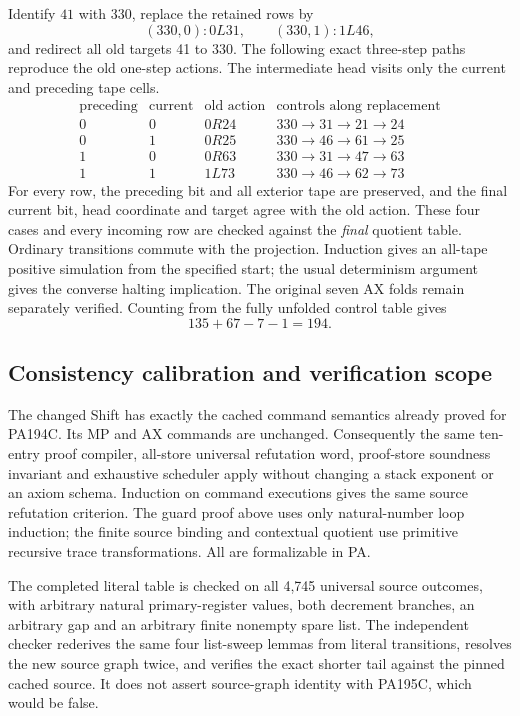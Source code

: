 Identify $41$ with $330$, replace the retained rows by
\[
                  (330,0):0L31,\qquad(330,1):1L46,
\]
and redirect all old targets 41 to 330. The following exact three-step
paths reproduce the old one-step actions. The intermediate head visits
only the current and preceding tape cells.
\[
\begin{array}{cc|c|l}
\text{preceding}&\text{current}&\text{old action}&\text{controls along replacement}\\\hline
0&0&0R24&330\to31\to21\to24\\
0&1&0R25&330\to46\to61\to25\\
1&0&0R63&330\to31\to47\to63\\
1&1&1L73&330\to46\to62\to73
\end{array}
\]
For every row, the preceding bit and all exterior tape are preserved,
and the final current bit, head coordinate and target agree with the
old action. These four cases and every incoming row are checked against
the \emph{final} quotient table. Ordinary transitions commute with the
projection. Induction gives an all-tape positive simulation from the
specified start; the usual determinism argument gives the converse
halting implication. The original seven AX folds remain separately
verified. Counting from the fully unfolded control table gives
\[
                         135+67-7-1=194.
\]

\subsection{Consistency calibration and verification scope}

The changed Shift has exactly the cached command semantics already
proved for PA194C. Its MP and AX commands are unchanged. Consequently
the same ten-entry proof compiler, all-store universal refutation word,
proof-store soundness invariant and exhaustive scheduler apply without
changing a stack exponent or an axiom schema. Induction on command
executions gives the same source refutation criterion. The guard proof
above uses only natural-number loop induction; the finite source binding
and contextual quotient use primitive recursive trace transformations.
All are formalizable in PA.

The completed literal table is checked on all 4,745 universal source
outcomes, with arbitrary natural primary-register values, both decrement
branches, an arbitrary gap and an arbitrary finite nonempty spare list.
The independent checker rederives the same four list-sweep lemmas from
literal transitions, resolves the new source graph twice, and verifies
the exact shorter tail against the pinned cached source. It does not
assert source-graph identity with PA195C, which would be false.

